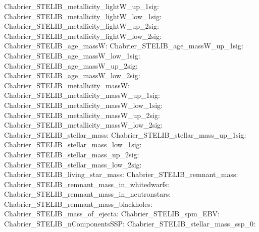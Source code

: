 Chabrier\_STELIB\_metallicity\_lightW\_up\_1sig:  \newline 
Chabrier\_STELIB\_metallicity\_lightW\_low\_1sig:  \newline 
Chabrier\_STELIB\_metallicity\_lightW\_up\_2sig:  \newline 
Chabrier\_STELIB\_metallicity\_lightW\_low\_2sig:  \newline 
Chabrier\_STELIB\_age\_massW:  \newline 
Chabrier\_STELIB\_age\_massW\_up\_1sig:  \newline 
Chabrier\_STELIB\_age\_massW\_low\_1sig:  \newline 
Chabrier\_STELIB\_age\_massW\_up\_2sig:  \newline 
Chabrier\_STELIB\_age\_massW\_low\_2sig:  \newline 
Chabrier\_STELIB\_metallicity\_massW:  \newline 
Chabrier\_STELIB\_metallicity\_massW\_up\_1sig:  \newline 
Chabrier\_STELIB\_metallicity\_massW\_low\_1sig:  \newline 
Chabrier\_STELIB\_metallicity\_massW\_up\_2sig:  \newline 
Chabrier\_STELIB\_metallicity\_massW\_low\_2sig:  \newline 
Chabrier\_STELIB\_stellar\_mass:  \newline 
Chabrier\_STELIB\_stellar\_mass\_up\_1sig:  \newline 
Chabrier\_STELIB\_stellar\_mass\_low\_1sig:  \newline 
Chabrier\_STELIB\_stellar\_mass\_up\_2sig:  \newline 
Chabrier\_STELIB\_stellar\_mass\_low\_2sig:  \newline 
Chabrier\_STELIB\_living\_star\_mass:  \newline 
Chabrier\_STELIB\_remnant\_mass:  \newline 
Chabrier\_STELIB\_remnant\_mass\_in\_whitedwarfs:  \newline 
Chabrier\_STELIB\_remnant\_mass\_in\_neutronstars:  \newline 
Chabrier\_STELIB\_remnant\_mass\_blackholes:  \newline 
Chabrier\_STELIB\_mass\_of\_ejecta:  \newline 
Chabrier\_STELIB\_spm\_EBV:  \newline 
Chabrier\_STELIB\_nComponentsSSP:  \newline 
Chabrier\_STELIB\_stellar\_mass\_ssp\_0:  \newline 
